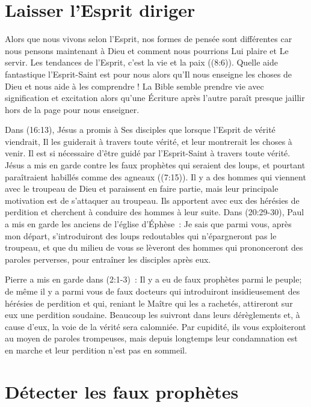\section*{Laisser l'Esprit diriger}

Alors que nous vivons selon l'Esprit, nos formes de pensée sont différentes
 car nous pensons maintenant à Dieu et comment nous pourrions
 Lui plaire et Le servir.
 Les tendances de l'Esprit, c'est la vie et la paix ((8:6)).
 Quelle aide fantastique l'Esprit-Saint est pour nous alors qu'Il nous enseigne
 les choses de Dieu et nous aide à les comprendre !
 La Bible semble prendre vie avec signification et excitation
 alors qu'une Écriture après l'autre paraît presque jaillir
 hors de la page pour nous enseigner.

Dans (16:13), Jésus a promis à Ses disciples
 que lorsque l'Esprit de vérité viendrait,
 Il les guiderait à travers toute vérité,
 et leur montrerait les choses à venir.
 Il est si nécessaire d'être guidé par l'Esprit-Saint
 à travers toute vérité.
 Jésus a mis en garde contre les faux prophètes qui seraient des loups,
 et pourtant paraîtraient habillés comme des agneaux ((7:15)).
 Il y a des hommes qui viennent avec le troupeau de Dieu
 et paraissent en faire partie, mais leur principale motivation
 est de s'attaquer au troupeau.
 Ils apportent avec eux des hérésies de perdition
 et cherchent à conduire des hommes à leur suite.
 Dans (20:29-30),
 Paul a mis en garde les anciens de l'église d'Éphèse~:
 \og Je sais que parmi vous, après mon départ,
 s'introduiront des loups redoutables qui n'épargneront pas le troupeau,
 et que du milieu de vous se lèveront des hommes
 qui prononceront des paroles perverses,
 pour entraîner les disciples après eux. \fg{}

Pierre a mis en garde dans (2:1-3)~:
 \og Il y a eu de faux prophètes parmi le peuple;
 de même il y a parmi vous de faux docteurs
 qui introduiront insidieusement des hérésies de perdition et qui,
 reniant le Maître qui les a rachetés,
 attireront sur eux une perdition soudaine.
 Beaucoup les suivront dans leurs dérèglements et, à cause d'eux,
 la voie de la vérité sera calomniée.
 Par cupidité, ils vous exploiteront au moyen de paroles trompeuses,
 mais depuis longtemps leur condamnation est en marche
 et leur perdition n'est pas en sommeil. \fg{}


\section*{Détecter les faux prophètes}

